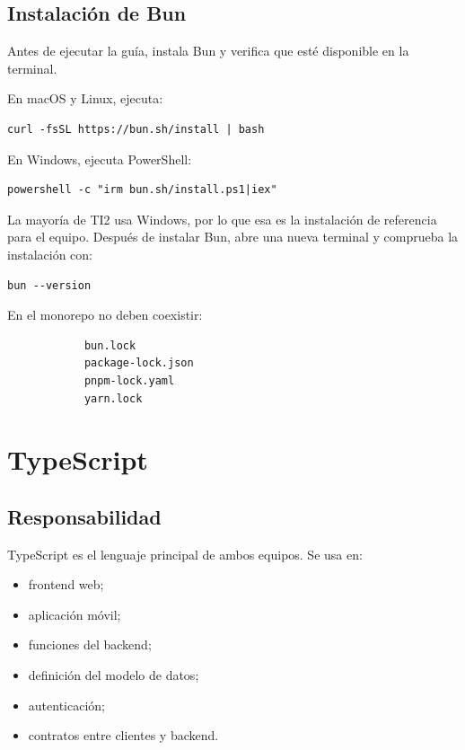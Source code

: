 \documentclass[11pt,a4paper]{article}
\begin{document}
\subsection{Instalación de Bun}

Antes de ejecutar la guía, instala Bun y verifica que esté disponible en la
terminal.

En macOS y Linux, ejecuta:

\begin{lstlisting}
curl -fsSL https://bun.sh/install | bash
\end{lstlisting}

En Windows, ejecuta PowerShell:

\begin{lstlisting}
powershell -c "irm bun.sh/install.ps1|iex"
\end{lstlisting}

La mayoría de TI2 usa Windows, por lo que esa es la instalación de referencia
para el equipo. Después de instalar Bun, abre una nueva terminal y comprueba la
instalación con:

\begin{lstlisting}
bun --version
\end{lstlisting}

En el monorepo no deben coexistir:

\begin{lstlisting}
            bun.lock
            package-lock.json
            pnpm-lock.yaml
            yarn.lock
\end{lstlisting}

\section{TypeScript}

\subsection{Responsabilidad}

TypeScript es el lenguaje principal de ambos equipos. Se usa en:

\begin{itemize}
  \item frontend web;
  \item aplicación móvil;
  \item funciones del backend;
  \item definición del modelo de datos;
  \item autenticación;
  \item contratos entre clientes y backend.
\end{itemize}
\end{document}

